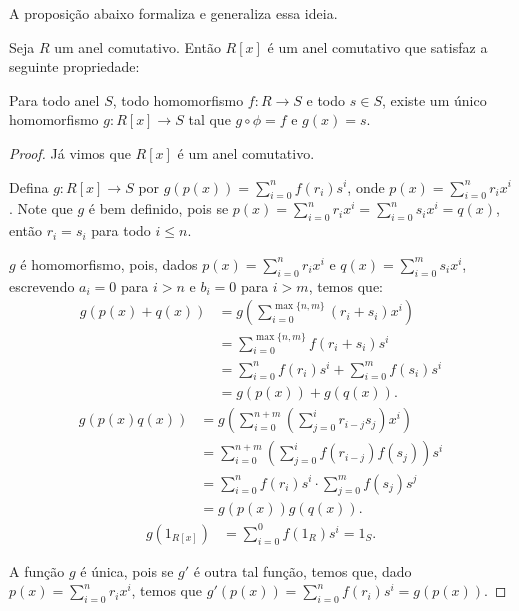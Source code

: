 A proposição abaixo formaliza e generaliza essa ideia.
\begin{prop}
    Seja $R$ um anel comutativo. Então
    $R[x]$ é um anel comutativo que satisfaz a seguinte propriedade:

    Para todo anel $S$, todo homomorfismo $f:R\rightarrow S$ e todo $s \in S$, existe um único homomorfismo $g:R[x]\rightarrow S$ tal que $g\circ \phi=f$ e $g(x)=s$.
\end{prop}
\begin{proof}
    Já vimos que $R[x]$ é um anel comutativo.

    Defina $g:R[x]\rightarrow S$ por $g(p(x))=\sum_{i=0}^n f(r_i)s^i$, onde $p(x)=\sum_{i=0}^n r_ix^i$.
    Note que $g$ é bem definido, pois se $p(x)=\sum_{i=0}^n r_ix^i=\sum_{i=0}^n s_ix^i=q(x)$, então $r_i=s_i$ para todo $i\leq n$.

    $g$ é homomorfismo, pois, dados $p(x)=\sum_{i=0}^n r_ix^i$ e $q(x)=\sum_{i=0}^m s_ix^i$, escrevendo $a_i=0$ para $i>n$ e $b_i=0$ para $i>m$, temos que:
    \begin{align*}
        g(p(x)+q(x))&=g\left(\sum_{i=0}^{\max\{n, m\}}(r_i+s_i)x^i\right)\\
        &=\sum_{i=0}^{\max\{n, m\}}f(r_i+s_i)s^i\\
        &=\sum_{i=0}^{n}f(r_i)s^i+\sum_{i=0}^{m}f(s_i)s^i\\
        &=g(p(x))+g(q(x)).
    \end{align*}
    \begin{align*}
        g(p(x)q(x))&=g\left(\sum_{i=0}^{n+m}\left(\sum_{j=0}^i r_{i-j}s_j\right)x^i\right)\\
        &=\sum_{i=0}^{n+m}\left(\sum_{j=0}^i f(r_{i-j})f(s_j)\right)s^i\\
        &=\sum_{i=0}^{n}f(r_i)s^i\cdot \sum_{j=0}^m f(s_j)s^j\\
        &=g(p(x))g(q(x)).
    \end{align*}
    \begin{align*}
        g(1_{R[x]})
        &=\sum_{i=0}^0 f(1_R)s^i=1_S.
    \end{align*}

    A função $g$ é única, pois se $g'$ é outra tal função, temos que, dado $p(x)=\sum_{i=0}^n r_ix^i$, temos que $g'(p(x))=\sum_{i=0}^nf(r_i)s^i=g(p(x))$.
\end{proof}

